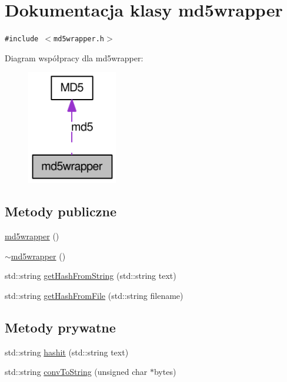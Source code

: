 \hypertarget{a00004}{
\section{Dokumentacja klasy md5wrapper}
\label{d0/d0b/a00004}
}
{\tt \#include $<$md5wrapper.h$>$}

Diagram współpracy dla md5wrapper:\nopagebreak
\begin{figure}[H]
\begin{center}
\leavevmode
\includegraphics[width=112pt]{d4/d6d/a00055}
\end{center}
\end{figure}
\subsection*{Metody publiczne}
\begin{CompactItemize}
\item 
\hyperlink{a00004_ae8138b76b89d93a4c21077b76d57c07}{md5wrapper} ()
\item 
\hyperlink{a00004_65e78258ad508d83be81d395f8bd43f4}{$\sim$md5wrapper} ()
\item 
std::string \hyperlink{a00004_225ba5a78228b867c3f17fdba959d8e6}{getHashFromString} (std::string text)
\item 
std::string \hyperlink{a00004_e6cd2a7928b997c5d6388ae81a0d841a}{getHashFromFile} (std::string filename)
\end{CompactItemize}
\subsection*{Metody prywatne}
\begin{CompactItemize}
\item 
std::string \hyperlink{a00004_608ecf61c0ecdf2fcb772e9fd6c51d5f}{hashit} (std::string text)
\item 
std::string \hyperlink{a00004_74f856c53740d3beb133074baffd21aa}{convToString} (unsigned char $\ast$bytes)
\end{CompactItemize}
